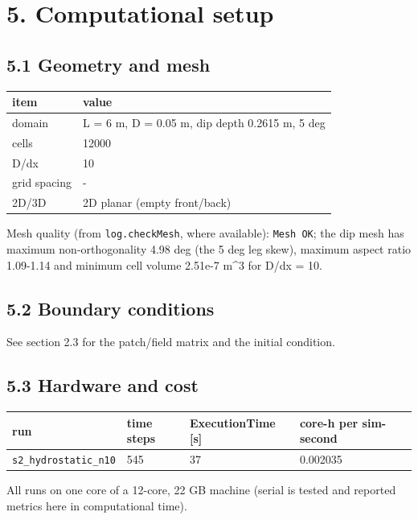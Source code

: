 \documentclass[11pt,english]{article}
\begin{document}
\section{5. Computational setup}\label{computational-setup}

\subsection{5.1 Geometry and mesh}\label{geometry-and-mesh}

\begin{longtable}[]{@{}ll@{}}
\toprule\noalign{}
item & value \\
\midrule\noalign{}
\endhead
\bottomrule\noalign{}
\endlastfoot
domain & L = 6 m, D = 0.05 m, dip depth 0.2615 m, 5 deg \\
cells & 12000 \\
D/dx & 10 \\
grid spacing & - \\
2D/3D & 2D planar (empty front/back) \\
\end{longtable}

Mesh quality (from \texttt{log.checkMesh}, where available):
\texttt{Mesh\ OK}; the dip mesh has maximum non-orthogonality 4.98 deg
(the 5 deg leg skew), maximum aspect ratio 1.09-1.14 and minimum cell
volume 2.51e-7 m\^{}3 for D/dx = 10.

\subsection{5.2 Boundary conditions}\label{boundary-conditions}

See section 2.3 for the patch/field matrix and the initial condition.

\subsection{5.3 Hardware and cost}\label{hardware-and-cost}

\begin{longtable}[]{@{}llll@{}}
\toprule\noalign{}
run & time steps & ExecutionTime {[}s{]} & core-h per sim-second \\
\midrule\noalign{}
\endhead
\bottomrule\noalign{}
\endlastfoot
\texttt{s2\_hydrostatic\_n10} & 545 & 37 & 0.002035 \\
\end{longtable}

All runs on one core of a 12-core, 22 GB machine (serial is tested and
reported metrics here in computational time).
\end{document}
